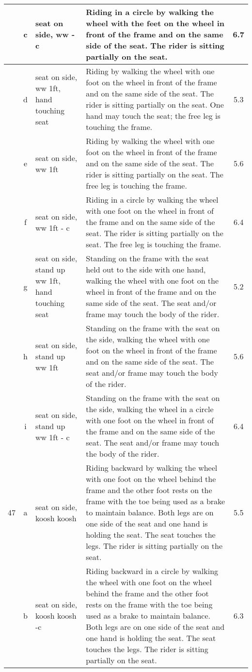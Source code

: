 \begin{longtable}{|r|c|p{4cm}|p{8cm}|c|}
\hline
  & c & seat on side, ww - c  & Riding in a circle by walking the wheel with the feet on the wheel in front of the frame and on the same side of the seat. The rider is sitting partially on the seat.  & 6.7 \\ 
\hline
  & d & seat on side, ww 1ft, hand touching seat  & Riding by walking the wheel with one foot on the wheel in front of the frame and on the same side of the seat. The rider is sitting partially on the seat. One hand may touch the seat; the free leg is touching the frame. & 5.3 \\ 
\hline
  & e & seat on side, ww 1ft  & Riding by walking the wheel with one foot on the wheel in front of the frame and on the same side of the seat. The rider is sitting partially on the seat. The free leg is touching the frame.  & 5.6 \\ 
\hline
  & f & seat on side, ww 1ft - c  & Riding in a circle by walking the wheel with one foot on the wheel in front of the frame and on the same side of the seat. The rider is sitting partially on the seat. The free leg is touching the frame.  & 6.4 \\ 
\hline
  & g & seat on side, stand up ww 1ft, hand touching seat & Standing on the frame with the seat held out to the side with one hand, walking the wheel with one foot on the wheel in front of the frame and on the same side of the seat. The seat and/or frame may touch the body of the rider. & 5.2 \\ 
\hline
  & h & seat on side, stand up ww 1ft & Standing on the frame with the seat on the side, walking the wheel with one foot on the wheel in front of the frame and on the same side of the seat. The seat and/or frame may touch the body of the rider.  & 5.6 \\ 
\hline
  & i & seat on side, stand up ww 1ft - c & Standing on the frame with the seat on the side, walking the wheel in a circle with one foot on the wheel in front of the frame and on the same side of the seat. The seat and/or frame may touch the body of the rider.  & 6.4 \\ 
\hline
47  & a & seat on side, koosh koosh & Riding backward by walking the wheel with one foot on the wheel behind the frame and the other foot rests on the frame with the toe being used as a brake to maintain balance. Both legs are on one side of the seat and one hand is holding the seat. The seat touches the legs. The rider is sitting partially on the seat. & 5.5 \\ 
\hline
  & b & seat on side, koosh koosh -c  & Riding backward in a circle by walking the wheel with one foot on the wheel behind the frame and the other foot rests on the frame with the toe being used as a brake to maintain balance. Both legs are on one side of the seat and one hand is holding the seat. The seat touches the legs. The rider is sitting partially on the seat. & 6.3 \\ 

\end{longtable}
